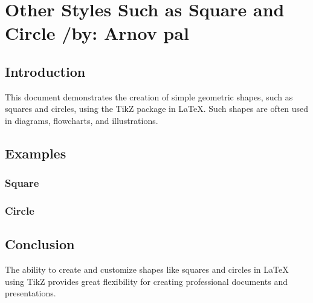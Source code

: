 \documentclass[12pt,a4paper]{article}
\begin{document}
	\section{Other Styles Such as Square and Circle /by: Arnov pal}
	\subsection{Introduction}
	This document demonstrates the creation of simple geometric shapes, such as squares and circles, using the TikZ package in LaTeX. Such shapes are often used in diagrams, flowcharts, and illustrations.
	
	\subsection{Examples}
	\subsubsection{Square}
	\begin{center}
	\end{center}
	
	\subsubsection{Circle}
	\begin{center}
	\end{center}
	
	\subsection{Conclusion}
	The ability to create and customize shapes like squares and circles in LaTeX using TikZ provides great flexibility for creating professional documents and presentations.
    
\end{document}
